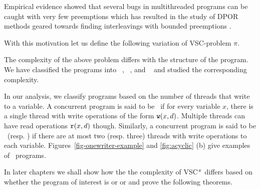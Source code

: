 Empirical evidence showed that several bugs in multithreaded programs can be caught with very
few preemptions  \cite{QadeerMusuvati}\cite{DBLP:conf/tacas/QadeerR05}   which has resulted in the study of DPOR methods geared
towards finding interleavings with bounded preemptions \cite{vafaedis}.  

With this motivation let us define the following variation of VSC-problem $\pi$.

 

\begin{center}
\end{center}

The complexity of the above problem differs with the structure of the program. We have classified the programs into \onewriter~, \twowriter~, and \threewriter~ and studied the corresponding complexity.   

 In our analysis, we classify programs based on the number of threads that write to a variable. A concurrent program is said to be \onewriter\ if for every variable $x$, there is a single thread with write operations of the form $\mathtt{w}(x, d)$. Multiple threads can have read operations $\mathtt{r}(x, d)$ though. Similarly, a concurrent program is said to be \twowriter\ (resp. \threewriter) if there are at most two (resp. three) threads with write operations to each variable. Figures~\ref{fig-onewriter-example} and \ref{fig:acyclic} (b) give examples of \onewriter\ programs. 

In later chapters we shall show how the  the complexity of VSC$^\pi$ differs based on whether the program of interest is \onewriter{} or \twowriter{} or \threewriter{} and prove the following theorems. 


